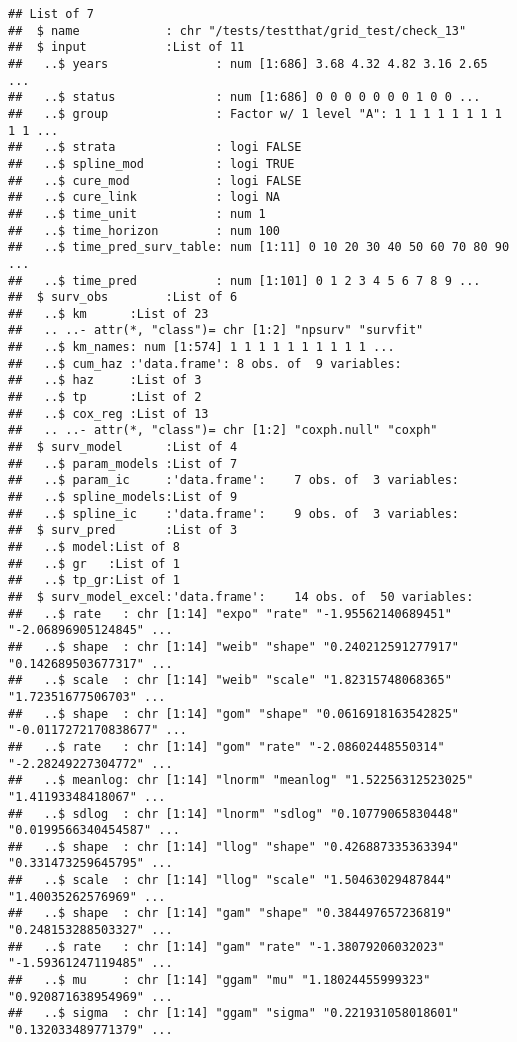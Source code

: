 \documentclass[
]{article}
\begin{document}
\begin{verbatim}
## List of 7
##  $ name            : chr "/tests/testthat/grid_test/check_13"
##  $ input           :List of 11
##   ..$ years               : num [1:686] 3.68 4.32 4.82 3.16 2.65 ...
##   ..$ status              : num [1:686] 0 0 0 0 0 0 0 1 0 0 ...
##   ..$ group               : Factor w/ 1 level "A": 1 1 1 1 1 1 1 1 1 1 ...
##   ..$ strata              : logi FALSE
##   ..$ spline_mod          : logi TRUE
##   ..$ cure_mod            : logi FALSE
##   ..$ cure_link           : logi NA
##   ..$ time_unit           : num 1
##   ..$ time_horizon        : num 100
##   ..$ time_pred_surv_table: num [1:11] 0 10 20 30 40 50 60 70 80 90 ...
##   ..$ time_pred           : num [1:101] 0 1 2 3 4 5 6 7 8 9 ...
##  $ surv_obs        :List of 6
##   ..$ km      :List of 23
##   .. ..- attr(*, "class")= chr [1:2] "npsurv" "survfit"
##   ..$ km_names: num [1:574] 1 1 1 1 1 1 1 1 1 1 ...
##   ..$ cum_haz :'data.frame': 8 obs. of  9 variables:
##   ..$ haz     :List of 3
##   ..$ tp      :List of 2
##   ..$ cox_reg :List of 13
##   .. ..- attr(*, "class")= chr [1:2] "coxph.null" "coxph"
##  $ surv_model      :List of 4
##   ..$ param_models :List of 7
##   ..$ param_ic     :'data.frame':    7 obs. of  3 variables:
##   ..$ spline_models:List of 9
##   ..$ spline_ic    :'data.frame':    9 obs. of  3 variables:
##  $ surv_pred       :List of 3
##   ..$ model:List of 8
##   ..$ gr   :List of 1
##   ..$ tp_gr:List of 1
##  $ surv_model_excel:'data.frame':    14 obs. of  50 variables:
##   ..$ rate   : chr [1:14] "expo" "rate" "-1.95562140689451" "-2.06896905124845" ...
##   ..$ shape  : chr [1:14] "weib" "shape" "0.240212591277917" "0.142689503677317" ...
##   ..$ scale  : chr [1:14] "weib" "scale" "1.82315748068365" "1.72351677506703" ...
##   ..$ shape  : chr [1:14] "gom" "shape" "0.0616918163542825" "-0.0117272170838677" ...
##   ..$ rate   : chr [1:14] "gom" "rate" "-2.08602448550314" "-2.28249227304772" ...
##   ..$ meanlog: chr [1:14] "lnorm" "meanlog" "1.52256312523025" "1.41193348418067" ...
##   ..$ sdlog  : chr [1:14] "lnorm" "sdlog" "0.10779065830448" "0.0199566340454587" ...
##   ..$ shape  : chr [1:14] "llog" "shape" "0.426887335363394" "0.331473259645795" ...
##   ..$ scale  : chr [1:14] "llog" "scale" "1.50463029487844" "1.40035262576969" ...
##   ..$ shape  : chr [1:14] "gam" "shape" "0.384497657236819" "0.248153288503327" ...
##   ..$ rate   : chr [1:14] "gam" "rate" "-1.38079206032023" "-1.59361247119485" ...
##   ..$ mu     : chr [1:14] "ggam" "mu" "1.18024455999323" "0.920871638954969" ...
##   ..$ sigma  : chr [1:14] "ggam" "sigma" "0.221931058018601" "0.132033489771379" ...

\end{verbatim}
\end{document}
